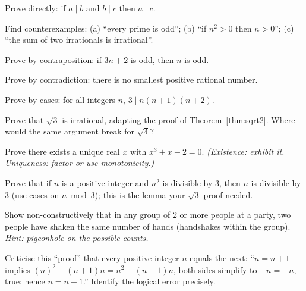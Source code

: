 \begin{exercise}{\easy}
Prove directly: if $a \mid b$ and $b \mid c$ then $a \mid c$.
\end{exercise}

\begin{exercise}{\easy}
Find counterexamples: (a) ``every prime is odd''; (b) ``if $n^2 > 0$ then
$n > 0$''; (c) ``the sum of two irrationals is irrational''.
\end{exercise}

\begin{exercise}{\medium}
Prove by contraposition: if $3n + 2$ is odd, then $n$ is odd.
\end{exercise}

\begin{exercise}{\medium}
Prove by contradiction: there is no smallest positive rational number.
\end{exercise}

\begin{exercise}{\medium}
Prove by cases: for all integers $n$, $3 \mid n(n+1)(n+2)$.
\end{exercise}

\begin{exercise}{\medium}
Prove that $\sqrt{3}$ is irrational, adapting the proof of
Theorem~\ref{thm:sqrt2}. Where would the same argument break for
$\sqrt{4}$?
\end{exercise}

\begin{exercise}{\medium}
Prove there exists a unique real $x$ with $x^{3} + x - 2 = 0$.
\emph{(Existence: exhibit it. Uniqueness: factor or use monotonicity.)}
\end{exercise}

\begin{exercise}{\hard}
Prove that if $n$ is a positive integer and $n^{2}$ is divisible by $3$,
then $n$ is divisible by $3$ (use cases on $n \bmod 3$); this is the lemma
your $\sqrt3$ proof needed.
\end{exercise}

\begin{exercise}{\hard}
Show non-constructively that in any group of $2$ or more people at a party,
two people have shaken the same number of hands (handshakes within the
group). \emph{Hint: pigeonhole on the possible counts.}
\end{exercise}

\begin{exercise}{\hard}
Criticise this ``proof'' that every positive integer $n$ equals the next:
``$n = n+1$ implies $(n)^2 - (n+1)n = n^2 - (n+1)n$, both sides simplify to
$-n = -n$, true; hence $n = n + 1$.'' Identify the logical error precisely.
\end{exercise}

